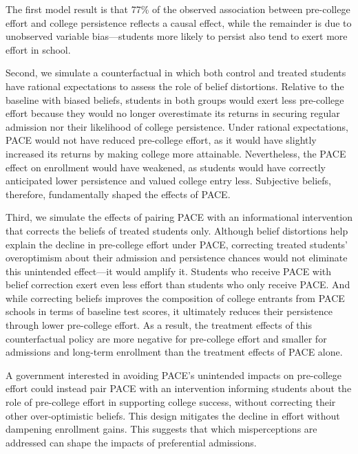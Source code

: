 The first model result is that 77\% of the observed association between pre-college effort and college persistence reflects a causal effect, while the remainder is due to unobserved variable bias—students more likely to persist also tend to exert more effort in school.\par 




Second, we simulate a counterfactual in which both control and treated students have rational expectations to assess the role of belief distortions. Relative to the baseline with biased beliefs, students in both groups would exert less pre-college effort because they would no longer overestimate its returns in securing regular admission nor their likelihood of college persistence. Under rational expectations, PACE would not have reduced pre-college effort, as it would have slightly increased its returns by making college more attainable. Nevertheless, the PACE effect on enrollment would have weakened, as students would have correctly anticipated lower persistence and valued college entry less. Subjective beliefs, therefore, fundamentally shaped the effects of PACE.\par 





Third, we simulate the effects of pairing PACE with an informational intervention that corrects the beliefs of treated students only.
Although belief distortions help explain the decline in pre-college effort under PACE, correcting treated students' overoptimism about their admission and persistence chances would not eliminate this unintended effect—it would amplify it. Students who receive PACE with belief correction exert even less effort than students who only receive PACE. And while correcting beliefs improves the composition of college entrants from PACE schools in terms of baseline test scores, it ultimately reduces their persistence through lower pre-college effort. As a result, the treatment effects of this counterfactual policy are more negative for pre-college effort and smaller for admissions and long-term enrollment than the treatment effects of PACE alone.\par 


A government interested in avoiding PACE's unintended impacts on pre-college effort could instead pair PACE with an intervention informing students about the role of pre-college effort in supporting college success, without correcting their other over-optimistic beliefs. This design mitigates the decline in effort without dampening enrollment gains. This suggests that which misperceptions are addressed can shape the impacts of preferential admissions.\par


